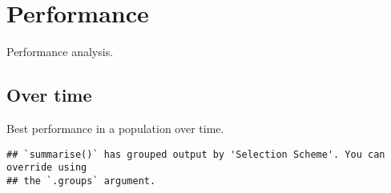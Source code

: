 \documentclass[]{book}
\newenvironment{Shaded}{\begin{snugshade}}{\end{snugshade}}
\newcommand{\CharTok}[1]{\textcolor[rgb]{0.31,0.60,0.02}{#1}}
\newcommand{\DataTypeTok}[1]{\textcolor[rgb]{0.13,0.29,0.53}{#1}}
\newcommand{\KeywordTok}[1]{\textcolor[rgb]{0.13,0.29,0.53}{\textbf{#1}}}
\newcommand{\NormalTok}[1]{#1}
\newcommand{\OperatorTok}[1]{\textcolor[rgb]{0.81,0.36,0.00}{\textbf{#1}}}
\newcommand{\StringTok}[1]{\textcolor[rgb]{0.31,0.60,0.02}{#1}}
\begin{document}
\hypertarget{performance-1}{%
\section{Performance}\label{performance-1}}

Performance analysis.

\hypertarget{over-time-2}{%
\subsection{Over time}\label{over-time-2}}

Best performance in a population over time.

\begin{Shaded}
\end{Shaded}

\begin{verbatim}
## `summarise()` has grouped output by 'Selection Scheme'. You can override using
## the `.groups` argument.
\end{verbatim}
\end{document}
